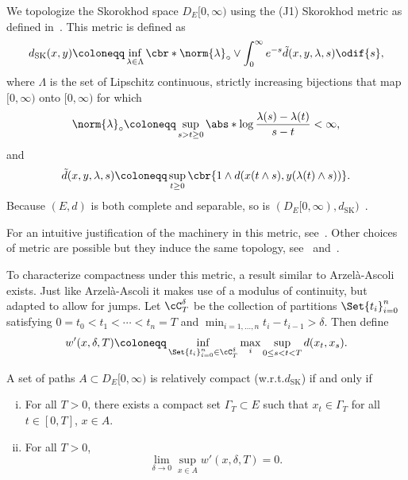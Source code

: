 We topologize the Skorokhod space \(D_E[0,\infty)\) using the (J1) Skorokhod metric as defined in~\cite[pp.116-117]{ethierMarkovProcessesCharacterization1985}.
This metric is defined as
\begin{equation}
  d_\mathrm{SK}(x,y) \coloneqq \inf_{\lambda \in \Lambda} \cbr*{ \norm{\lambda}_\circ \lor \int_0^\infty e^{-s} \tilde{d}(x,y,\lambda,s) \odif{s} },
\end{equation}
where \(\Lambda\) is the set of Lipschitz continuous, strictly increasing bijections that map \([0,\infty)\) onto \([0,\infty)\) for which
\begin{equation}
  \norm{\lambda}_\circ \coloneqq \sup_{s > t \geq 0} \abs*{ \log \frac{\lambda(s)-\lambda(t)}{s-t} } < \infty,
\end{equation}
and
\begin{equation}
  \tilde{d}(x,y,\lambda,s) \coloneqq \sup_{t \geq 0} \cbr{ 1 \land d(x(t \land s), y(\lambda(t) \land s)) }.
\end{equation}
Because \((E, d)\) is both complete and separable, so is \((D_E[0,\infty), d_\mathrm{SK})\)~\cite[Theorem 3.5.6]{ethierMarkovProcessesCharacterization1985}.

For an intuitive justification of the machinery in this metric, see~\cite{kernSkorokhodTopologiesWhat2024}.
Other choices of metric are possible but they induce the same topology, see~\cite[pp.166-168]{billingsleyConvergenceProbabilityMeasures1999} and~\cite[p.122-123]{pollardConvergenceStochasticProcesses1984}.

To characterize compactness under this metric, a result similar to Arzelà-Ascoli exists.
Just like Arzelà-Ascoli it makes use of a modulus of continuity, but adapted to allow for jumps.
Let \(\cC_T^\delta\) be the collection of partitions \(\Set{t_i}_{i=0}^n\) satisfying \(0 = t_0 < t_1 < \cdots < t_n = T\) and \(\min_{i=1,\dots,n} t_i - t_{i-1} > \delta\).
Then define
\begin{equation}
  w'(x, \delta, T) \coloneqq \inf_{\Set{t_i}_{i=0}^n \in \cC_T^\delta} \max_i \sup_{0 \leq s < t < T} d(x_t,x_s).
\end{equation}

\begin{theorem}\label{prelim:thm:rel-compact-in-SK}
  A set of paths \(A \subset D_E[0,\infty)\) is relatively compact (w.r.t.\@ \(d_\mathrm{SK}\)) if and only if
  \begin{enumerate}[(i)]
    \item For all \(T > 0\), there exists a compact set \(\Gamma_T \subset E\) such that \(x_t \in \Gamma_T\) for all \(t \in [0,T]\), \(x \in A\).
    \item For all \(T > 0\),
      \begin{equation}
        \lim_{\delta\to0} \sup_{x \in A} w'(x,\delta,T) = 0.
      \end{equation}
  \end{enumerate}
\end{theorem}

